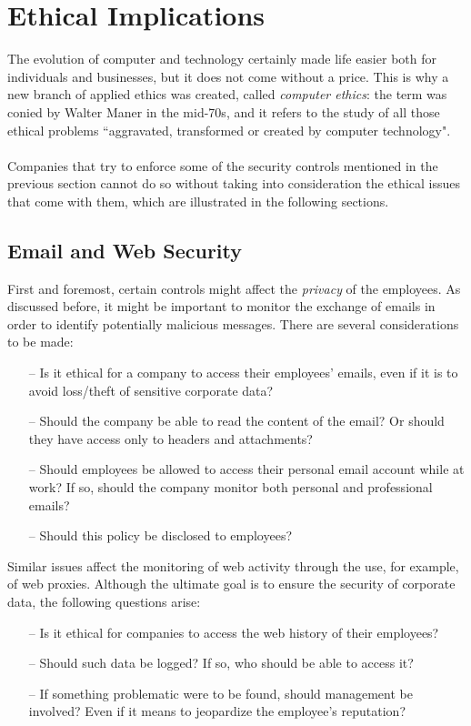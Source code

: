\section{Ethical Implications}
	The evolution of computer and technology certainly made life easier both for individuals and businesses, but it does not come without a price. This is why a new branch of applied ethics was created, called \textit{computer ethics}: the term was conied by Walter Maner in the mid-70s, and it refers to the study of all those ethical problems ``aggravated, transformed or created by computer 
	technology"\cite{cyberethics}.\\\\
	Companies that try to enforce some of the security controls mentioned in the previous section cannot do so without taking into consideration the ethical issues that come with them, which are illustrated in the following sections.
	\subsection{Email and Web Security}
	First and foremost, certain controls might affect the \textit{privacy} of the employees. As discussed before, it might be important to monitor the exchange of emails in order to identify potentially malicious messages. There are several considerations to be made:
	\begin{itemize}
		\item[--] Is it ethical for a company to access their employees' emails, even if it is to avoid loss/theft of sensitive corporate data?
		\item[--] Should the company be able to read the content of the email? Or should they have access only to headers and attachments?
		\item[--] Should employees be allowed to access their personal email account while at work? If so, should the company monitor both personal and professional emails?
		\item[--] Should this policy be disclosed to employees? 
	\end{itemize}
	Similar issues affect the monitoring of web activity through the use, for example, of web proxies. Although the ultimate goal is to ensure the security of corporate data, the following questions arise:
	\begin{itemize}
		\item[--] Is it ethical for companies to access the web history of their employees?
		\item[--] Should such data be logged? If so, who should be able to access it?
		\item[--] If something problematic were to be found, should management be involved? Even if it means to jeopardize the employee's reputation?
	\end{itemize}
